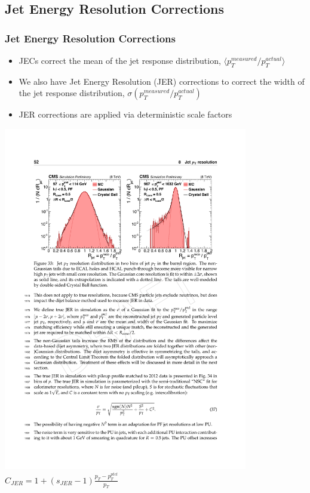 \subsection{Jet Energy Resolution Corrections}
\begin{frame}
	\frametitle{Jet Energy Resolution Corrections}
	\vspace*{-0.25cm}
	\begin{block}{}
		\begin{itemize}
		    \footnotesize
            \item JECs correct the mean of the jet response distribution, $\langle p_{T}^{measured}/p_{T}^{actual} \rangle$
            \item We also have Jet Energy Resolution (JER) corrections to correct the width of the jet response distribution, $\sigma (p_{T}^{measured}/p_{T}^{actual})$
            \item JER corrections are applied via deterministic scale factors
		\end{itemize}
	\end{block}
	\begin{center}
		\includegraphics[width=0.8\textwidth]{images/jer.pdf}
		$C_{JER}=1+\left(s_{JER}-1\right)\frac{p_{T}-p_{T}^{ptcl}}{p_{T}}$
	\end{center}
\end{frame}

